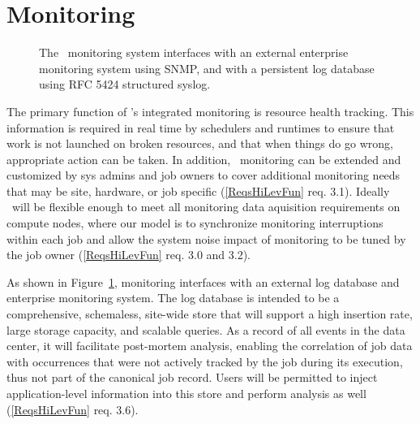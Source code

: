 \section{Monitoring}

\begin{figure}
\centering
{}
\caption{The \ngrm\ monitoring system interfaces with an external
enterprise monitoring system using SNMP, and with a persistent log
database using RFC 5424 structured syslog.}
\label{FigMonExt}
\end{figure}

The primary function of \ngrm's integrated monitoring is resource
health tracking.  This information is required in real time by schedulers
and runtimes to ensure that work is not launched on broken resources,
and that when things do go wrong, appropriate action can be taken.
In addition, \ngrm\ monitoring can be extended and customized
by sys admins and job owners to cover additional monitoring needs
that may be site, hardware, or job specific
(\ref{ReqsHiLevFun} req. 3.1).
Ideally \ngrm\ will be flexible enough to meet all
monitoring data aquisition requirements on compute nodes,
where our model is to synchronize monitoring interruptions within each job
and allow the system noise impact of monitoring to be tuned by the job owner
(\ref{ReqsHiLevFun} req. 3.0 and 3.2).

As shown in Figure~\ref{FigMonExt}, monitoring interfaces with an external
log database and enterprise monitoring system.
The log database is intended to be a comprehensive, schemaless, site-wide
store that will support a high insertion rate, large storage capacity,
and scalable queries.
As a record of all events in the data center, it will facilitate
post-mortem analysis, enabling the correlation of job data
with occurrences that were not actively tracked by the job during its
execution, thus not part of the canonical job record.
Users will be permitted to inject application-level information into this
store and perform analysis as well
(\ref{ReqsHiLevFun} req. 3.6).


